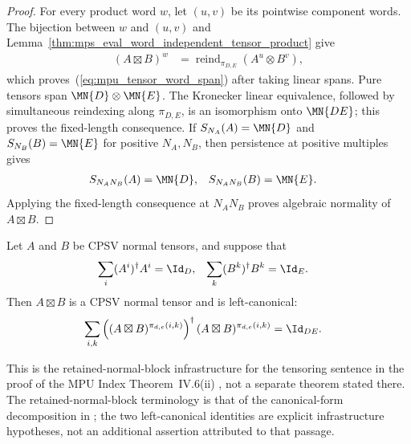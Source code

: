 \begin{proof}\leanok
    For every product word $w$, let $(u,v)$ be its pointwise component words.
    The bijection between $w$ and $(u,v)$ and
    Lemma~\ref{thm:mps_eval_word_independent_tensor_product} give
    \begin{align}
        (A\boxtimes B)^w
         & =\operatorname{reind}_{\pi_{D,E}}(A^u\otimes B^v),
    \end{align}
    which proves~(\ref{eq:mpu_tensor_word_span}) after taking linear spans.
    Pure tensors span $\MN{D}\otimes\MN{E}$.  The Kronecker linear
    equivalence, followed by simultaneous reindexing along $\pi_{D,E}$, is an
    isomorphism onto $\MN{DE}$; this proves the fixed-length consequence.  If
    $S_{N_A}(A)=\MN{D}$ and $S_{N_B}(B)=\MN{E}$ for positive $N_A,N_B$, then
    persistence at positive multiples gives
    \begin{align}
        S_{N_A N_B}(A) & =\MN{D}, &
        S_{N_A N_B}(B) & =\MN{E}.
    \end{align}
    Applying the fixed-length consequence at $N_A N_B$ proves algebraic
    normality of $A\boxtimes B$.
\end{proof}

\begin{lemma}
    \label{thm:mps_normal_block_tensor_product}
    \leanok
    Let $A$ and $B$ be CPSV normal tensors, and suppose that
    \begin{align}
        \sum_i(A^i)^\dagger A^i & =\Id_D, &
        \sum_k(B^k)^\dagger B^k & =\Id_E.
        \label{eq:mpu_tensor_left_canonical_inputs}
    \end{align}
    Then $A\boxtimes B$ is a CPSV normal tensor and is left-canonical:
    \begin{align}
        \sum_{i,k}
        \left((A\boxtimes B)^{\pi_{d,e}(i,k)}\right)^\dagger
        (A\boxtimes B)^{\pi_{d,e}(i,k)}
         & =\Id_{DE}.
        \label{eq:mpu_tensor_left_canonical_output}
    \end{align}

    This is the retained-normal-block infrastructure for the tensoring
    sentence in the proof of the MPU Index Theorem~IV.6(ii)
    \cite[lines~824--845]{Cirac2017MPU}, not a separate theorem stated there.
    The retained-normal-block terminology is that of the canonical-form
    decomposition in
    \cite[Section~2.3, lines~214--245]{Cirac2016MPDO_arXiv}; the two
    left-canonical identities are explicit infrastructure hypotheses, not an
    additional assertion attributed to that passage.
\end{lemma}

